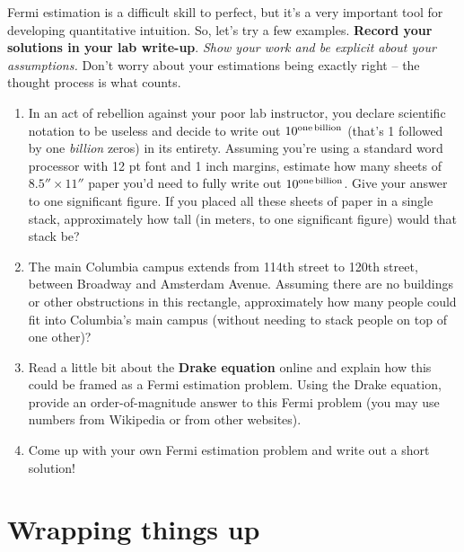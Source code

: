 \documentclass[11pt]{article}
\begin{document}
Fermi estimation is a difficult skill to perfect, but it's a very important tool for developing quantitative intuition. So, let's try a few examples. \textbf{Record your solutions in your lab write-up}. \textit{Show your work and be explicit about your assumptions.} Don't worry about your estimations being exactly right -- the thought process is what counts.
\begin{enumerate}
    \item In an act of rebellion against your poor lab instructor, you declare scientific notation to be useless and decide to write out $10^{\rm one \, billion}$ (that's 1 followed by one \emph{billion} zeros) in its entirety. Assuming you're using a standard word processor with 12 pt font and 1 inch margins, estimate how many sheets of $8.5'' \times 11''$ paper you'd need to fully write out $10^{\rm one \, billion}$. Give your answer to one significant figure. If you placed all these sheets of paper in a single stack, approximately how tall (in meters, to one significant figure) would that stack be? 
    
    \item The main Columbia campus extends from 114th street to 120th street, between Broadway and Amsterdam Avenue. Assuming there are no buildings or other obstructions in this rectangle, approximately how many people could fit into Columbia's main campus (without needing to stack people on top of one other)? 
    
    \item Read a little bit about the \textbf{Drake equation} online and explain how this could be framed as a Fermi estimation problem. Using the Drake equation, provide an order-of-magnitude answer to this Fermi problem (you may use numbers from Wikipedia or from other websites). 
    
    \item Come up with your own Fermi estimation problem and write out a short solution!
\end{enumerate}

\section{Wrapping things up}
\end{document}
